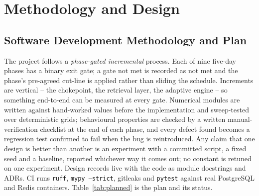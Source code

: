 \documentclass{tietreport}
\begin{document}
\chapter{Methodology and Design}
\label{ch:method}

\section{Software Development Methodology and Plan}
\label{sec:plan}

The project follows a \emph{phase-gated incremental} process. Each of nine five-day phases has
a binary exit gate; a gate not met is recorded as not met and the phase's pre-agreed cut-line
is applied rather than sliding the schedule. Increments are vertical -- the chokepoint, the
retrieval layer, the adaptive engine -- so something end-to-end can be measured at every gate.
Numerical modules are written against hand-worked values before the implementation and
sweep-tested over deterministic grids; behavioural properties are checked by a written
manual-verification checklist at the end of each phase, and every defect found becomes a
regression test confirmed to fail when the bug is reintroduced. Any claim that one design is
better than another is an experiment with a committed script, a fixed seed and a baseline,
reported whichever way it comes out; no constant is retuned on one experiment. Design records
live with the code as module docstrings and ADRs. CI runs \texttt{ruff}, \texttt{mypy --strict},
gitleaks and \texttt{pytest} against real PostgreSQL and Redis containers.
Table~\ref{tab:planned} is the plan and its status.
\end{document}
